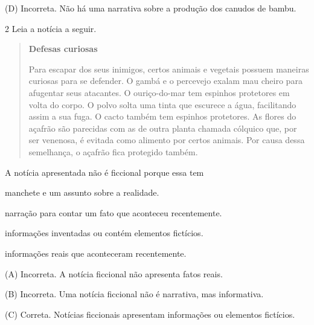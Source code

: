 \begin{escolha}
\begin{escolha}
{\begin{escolha}
(D) Incorreta. Não há uma narrativa sobre a produção dos canudos de
bambu.

\num{2} Leia a notícia a seguir.

\begin{quote}
\textbf{Defesas curiosas}

Para escapar dos seus inimigos, certos animais e vegetais possuem
maneiras curiosas para se defender. O gambá e o percevejo exalam mau
cheiro para afugentar seus atacantes. O ouriço-do-mar tem espinhos
protetores em volta do corpo. O polvo solta uma tinta que escurece a
água, facilitando assim a sua fuga. O cacto também tem espinhos
protetores. As flores do açafrão são parecidas com as de outra planta
chamada cólquico que, por ser venenosa, é evitada como alimento por
certos animais. Por causa dessa semelhança, o açafrão fica protegido
também.
\end{quote}


A notícia apresentada não é ficcional porque essa tem

\begin{escolha}
\item manchete e um assunto sobre a realidade.

\item narração para contar um fato que aconteceu recentemente.

\item informações inventadas ou contém elementos fictícios.

\item informações reais que aconteceram recentemente.
\end{escolha}


(A) Incorreta. A notícia ficcional não apresenta fatos reais.

(B) Incorreta. Uma notícia ficcional não é narrativa, mas informativa.

(C) Correta. Notícias ficcionais apresentam informações ou elementos fictícios.


\end{escolha}}
\end{escolha}
\end{escolha}
